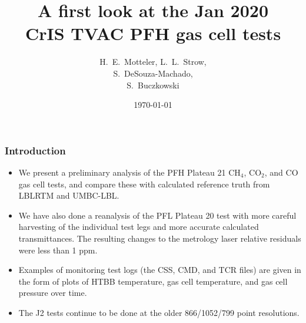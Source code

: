 \documentclass[10pt]{beamer}
\title{A first look at the Jan 2020\\
  CrIS TVAC PFH gas cell tests}
\author{H.~E.~Motteler, L.~L.~Strow, \\
  S.~DeSouza-Machado, \\
  S.~Buczkowski
}
\institute{
  UMBC Atmospheric Spectroscopy Lab \\
  Joint Center for Earth Systems Technology \\
}
\date{\today}
\begin{document}
\begin{frame}[plain]
\titlepage
\end{frame}
\begin{frame}
\frametitle{Introduction}
\begin{itemize}

  \item We present a preliminary analysis of the PFH Plateau 21
    CH$_4$, CO$_2$, and CO gas cell tests, and compare these with
    calculated reference truth from LBLRTM and UMBC-LBL.

  \item We have also done a reanalysis of the PFL Plateau 20 test
    with more careful harvesting of the individual test legs and
    more accurate calculated transmittances.  The resulting changes
    to the metrology laser relative residuals were less than 1 ppm.
 
   \item Examples of monitoring test logs (the CSS, CMD, and TCR
     files) are given in the form of plots of HTBB temperature, gas
     cell temperature, and gas cell pressure over time.

  \item The J2 tests continue to be done at the older 866/1052/799
    point resolutions.
    
\end{itemize}
\end{frame}
\end{document}
